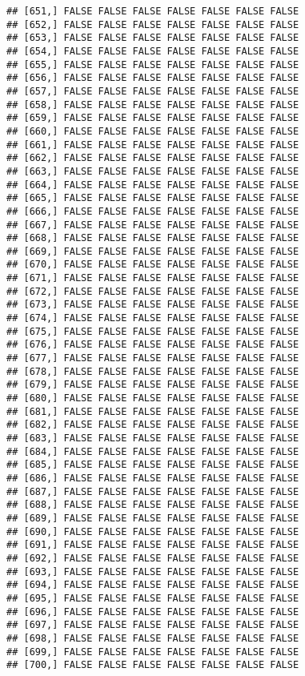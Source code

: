 \documentclass[
]{article}
\begin{document}
\begin{verbatim}
## [651,] FALSE FALSE FALSE FALSE FALSE FALSE FALSE
## [652,] FALSE FALSE FALSE FALSE FALSE FALSE FALSE
## [653,] FALSE FALSE FALSE FALSE FALSE FALSE FALSE
## [654,] FALSE FALSE FALSE FALSE FALSE FALSE FALSE
## [655,] FALSE FALSE FALSE FALSE FALSE FALSE FALSE
## [656,] FALSE FALSE FALSE FALSE FALSE FALSE FALSE
## [657,] FALSE FALSE FALSE FALSE FALSE FALSE FALSE
## [658,] FALSE FALSE FALSE FALSE FALSE FALSE FALSE
## [659,] FALSE FALSE FALSE FALSE FALSE FALSE FALSE
## [660,] FALSE FALSE FALSE FALSE FALSE FALSE FALSE
## [661,] FALSE FALSE FALSE FALSE FALSE FALSE FALSE
## [662,] FALSE FALSE FALSE FALSE FALSE FALSE FALSE
## [663,] FALSE FALSE FALSE FALSE FALSE FALSE FALSE
## [664,] FALSE FALSE FALSE FALSE FALSE FALSE FALSE
## [665,] FALSE FALSE FALSE FALSE FALSE FALSE FALSE
## [666,] FALSE FALSE FALSE FALSE FALSE FALSE FALSE
## [667,] FALSE FALSE FALSE FALSE FALSE FALSE FALSE
## [668,] FALSE FALSE FALSE FALSE FALSE FALSE FALSE
## [669,] FALSE FALSE FALSE FALSE FALSE FALSE FALSE
## [670,] FALSE FALSE FALSE FALSE FALSE FALSE FALSE
## [671,] FALSE FALSE FALSE FALSE FALSE FALSE FALSE
## [672,] FALSE FALSE FALSE FALSE FALSE FALSE FALSE
## [673,] FALSE FALSE FALSE FALSE FALSE FALSE FALSE
## [674,] FALSE FALSE FALSE FALSE FALSE FALSE FALSE
## [675,] FALSE FALSE FALSE FALSE FALSE FALSE FALSE
## [676,] FALSE FALSE FALSE FALSE FALSE FALSE FALSE
## [677,] FALSE FALSE FALSE FALSE FALSE FALSE FALSE
## [678,] FALSE FALSE FALSE FALSE FALSE FALSE FALSE
## [679,] FALSE FALSE FALSE FALSE FALSE FALSE FALSE
## [680,] FALSE FALSE FALSE FALSE FALSE FALSE FALSE
## [681,] FALSE FALSE FALSE FALSE FALSE FALSE FALSE
## [682,] FALSE FALSE FALSE FALSE FALSE FALSE FALSE
## [683,] FALSE FALSE FALSE FALSE FALSE FALSE FALSE
## [684,] FALSE FALSE FALSE FALSE FALSE FALSE FALSE
## [685,] FALSE FALSE FALSE FALSE FALSE FALSE FALSE
## [686,] FALSE FALSE FALSE FALSE FALSE FALSE FALSE
## [687,] FALSE FALSE FALSE FALSE FALSE FALSE FALSE
## [688,] FALSE FALSE FALSE FALSE FALSE FALSE FALSE
## [689,] FALSE FALSE FALSE FALSE FALSE FALSE FALSE
## [690,] FALSE FALSE FALSE FALSE FALSE FALSE FALSE
## [691,] FALSE FALSE FALSE FALSE FALSE FALSE FALSE
## [692,] FALSE FALSE FALSE FALSE FALSE FALSE FALSE
## [693,] FALSE FALSE FALSE FALSE FALSE FALSE FALSE
## [694,] FALSE FALSE FALSE FALSE FALSE FALSE FALSE
## [695,] FALSE FALSE FALSE FALSE FALSE FALSE FALSE
## [696,] FALSE FALSE FALSE FALSE FALSE FALSE FALSE
## [697,] FALSE FALSE FALSE FALSE FALSE FALSE FALSE
## [698,] FALSE FALSE FALSE FALSE FALSE FALSE FALSE
## [699,] FALSE FALSE FALSE FALSE FALSE FALSE FALSE
## [700,] FALSE FALSE FALSE FALSE FALSE FALSE FALSE

\end{verbatim}
\end{document}
